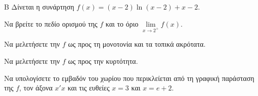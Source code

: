 \begin{thema}{Β}
Δίνεται η συνάρτηση $f(x) = (x-2)\ln(x-2) + x - 2$.
\begin{erwthma}
\item Να βρείτε το πεδίο ορισμού της $f$ και το όριο $\lim\limits_{x \to 2^+} f(x)$.
\item Να μελετήσετε την $f$ ως προς τη μονοτονία και τα τοπικά ακρότατα.
\item Να μελετήσετε την $f$ ως προς την κυρτότητα.
\item Να υπολογίσετε το εμβαδόν του χωρίου που περικλείεται από τη γραφική παράσταση της $f$, τον άξονα $x'x$ και τις ευθείες $x=3$ και $x=e+2$.
\end{erwthma}
\end{thema}
